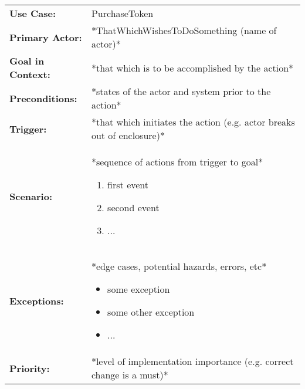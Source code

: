 \documentclass[12pt]{article}
\begin{document}
    \begin{table}[H]
    \begin{tabular}{lp{9.9cm}}
        \hline
        \textbf{Use Case:}                     & PurchaseToken \\

        \textbf{Primary Actor:}                & *ThatWhichWishesToDoSomething (name of actor)*\\

        \textbf{Goal in Context:}              & *that which is to be accomplished by the action* \\

        \textbf{Preconditions:}                & *states of the actor and system prior to the action* \\

        \textbf{Trigger:}                      & *that which initiates the action (e.g. actor breaks out of enclosure)*\\

        \textbf{Scenario:}                     & *sequence of actions from trigger to goal*
                                                 \begin{enumerate}
                                                     \item first event
                                                     \item second event
                                                     \item ...
                                                 \end{enumerate} \\

        \textbf{Exceptions:}                   & *edge cases, potential hazards, errors, etc*
                                                 \begin{itemize}
                                                     \item[] some exception
                                                     \item[] some other exception
                                                     \item[] ...
                                                 \end{itemize}\\

        \textbf{Priority:}                     & *level of implementation importance (e.g. correct change is a must)*\\


\end{tabular}
\end{table}
\end{document}
